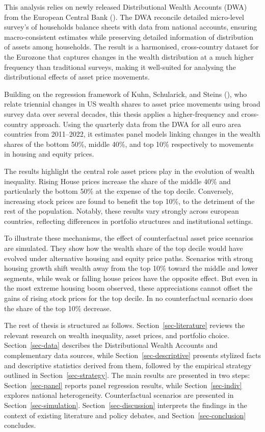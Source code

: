 \documentclass[
  a4paper,
  DIV=11,
  numbers=noendperiod]{scrartcl}
\begin{document}
This analysis relies on newly released Distributional Wealth Accounts
(DWA) from the European Central Bank
(). The DWA reconcile detailed micro-level survey's of
households balance sheets with data from national accounts, ensuring
macro-consistent estimates while preserving detailed information of
distribution of assets among households. The result is a harmonised,
cross-country dataset for the Eurozone that captures changes in the
wealth distribution at a much higher frequency than traditional surveys,
making it well-suited for analysing the distributional effects of asset
price movements.

Building on the regression framework of Kuhn, Schularick, and Steins
(), who relate
triennial changes in US wealth shares to asset price movements using
broad survey data over several decades, this thesis applies a
higher-frequency and cross-country approach. Using the quarterly data
from the DWA for all euro area countries from 2011--2022, it estimates
panel models linking changes in the wealth shares of the bottom 50\%,
middle 40\%, and top 10\% respectively to movements in housing and
equity prices.

The results highlight the central role asset prices play in the
evolution of wealth inequality. Rising House prices increase the share
of the middle 40\% and particularly the bottom 50\% at the expense of
the top decile. Conversely, increasing stock prices are found to benefit
the top 10\%, to the detriment of the rest of the population. Notably,
these results vary strongly across european countries, reflecting
differences in portfolio structures and institutional settings.

To illustrate these mechanisms, the effect of counterfactual asset price
scenarios are simulated. They show how the wealth share of the top
decile would have evolved under alternative housing and equity price
paths. Scenarios with strong housing growth shift wealth away from the
top 10\% toward the middle and lower segments, while weak or falling
house prices have the opposite effect. But even in the most extreme
housing boom observed, these appreciations cannot offset the gains of
rising stock prices for the top decile. In no counterfactual scenario
does the share of the top 10\% decrease.

The rest of thesis is structured as follows.
Section~\ref{sec-literature} reviews the relevant research on wealth
inequality, asset prices, and portfolio choice. Section~\ref{sec-data}
describes the Distributional Wealth Accounts and complementary data
sources, while Section~\ref{sec-descriptive} presents stylized facts and
descriptive statistics derived from them, followed by the empirical
strategy outlined in Section~\ref{sec-strategy}. The main results are
presented in two steps: Section~\ref{sec-panel} reports panel regression
results, while Section~\ref{sec-indiv} explores national heterogeneity.
Counterfactual scenarios are presented in Section~\ref{sec-simulation}.
Section~\ref{sec-discussion} interprets the findings in the context of
existing literature and policy debates, and Section~\ref{sec-conclusion}
concludes.
\end{document}
